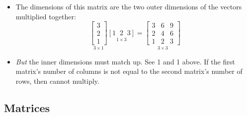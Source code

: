 \begin{itemize}
\begin{equation*}
    \end{equation*}
    \begin{itemize}
        \item The dimensions of this matrix are the two outer dimensions of the vectors multiplied together:
        \begin{equation*}
            \underset{3 \times 1}{\begin{bmatrix}
                3 \\
                2 \\
                1
            \end{bmatrix}}
            \underset{1 \times 3}{[1 \; \; 2 \; \; 3]} = 
            \underset{3 \times 3}{
            \begin{bmatrix}
                3 & 6 & 9 \\
                2 & 4 & 6 \\
                1 & 2 & 3
            \end{bmatrix}
            }
        \end{equation*}
        \item \emph{But} the inner dimensions must match up. See 1 and 1 above. If the first matrix's number of columns is not equal to the second matrix's number of rows, then cannot multiply.
    \end{itemize}
\end{itemize}

\subsection{Matrices}

